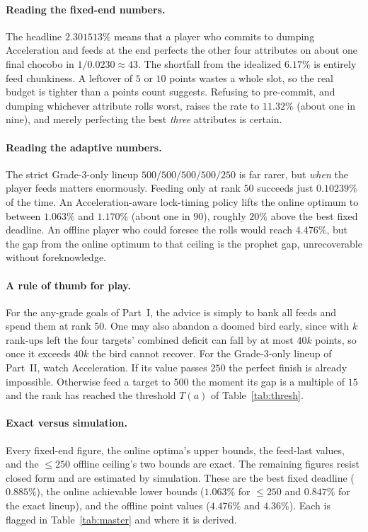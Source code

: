 \documentclass[11pt]{article}
\theoremstyle{remark}
\begin{document}
\paragraph{Reading the fixed-end numbers.}
The headline $2.301513\%$ means that a player who commits to dumping Acceleration and
feeds at the end perfects the other four attributes on about one final chocobo in
$1/0.0230\approx 43$. The shortfall from the idealized $6.17\%$ is entirely feed
chunkiness. A leftover of $5$ or $10$ points wastes a whole slot, so the real budget
is tighter than a points count suggests. Refusing to pre-commit, and dumping whichever
attribute rolls worst, raises the rate to $11.32\%$ (about one in nine), and merely
perfecting the best \emph{three} attributes is certain.

\paragraph{Reading the adaptive numbers.}
The strict Grade-3-only lineup $500/500/500/500/250$ is far rarer, but \emph{when}
the player feeds matters enormously. Feeding only at rank $50$ succeeds just
$0.10239\%$ of the time. An Acceleration-aware lock-timing policy lifts the online
optimum to between $1.063\%$ and $1.170\%$ (about one in $90$), roughly $20\%$ above
the best fixed deadline. An offline player who could foresee the rolls would reach
$4.476\%$, but the gap from the online optimum to that ceiling is the prophet gap,
unrecoverable without foreknowledge.

\paragraph{A rule of thumb for play.}
For the any-grade goals of Part~I, the advice is simply to bank all feeds and spend
them at rank $50$. One may also abandon a doomed bird early, since with $k$ rank-ups
left the four targets' combined deficit can fall by at most $40k$ points, so once it
exceeds $40k$ the bird cannot recover. For the Grade-3-only lineup of Part~II, watch
Acceleration. If its value passes $250$ the perfect finish is already impossible.
Otherwise feed a target to $500$ the moment its gap is a multiple of $15$ and the rank
has reached the threshold $T(a)$ of Table~\ref{tab:thresh}.

\paragraph{Exact versus simulation.}
Every fixed-end figure, the online optima's upper bounds, the feed-last values, and
the $\le 250$ offline ceiling's two bounds are exact. The remaining figures resist
closed form and are estimated by simulation. These are the best fixed deadline ($0.885\%$), the
online achievable lower bounds ($1.063\%$ for $\le 250$ and $0.847\%$ for the exact
lineup), and the offline point values ($4.476\%$ and $4.36\%$). Each is flagged in
Table~\ref{tab:master} and where it is derived.
\end{document}
